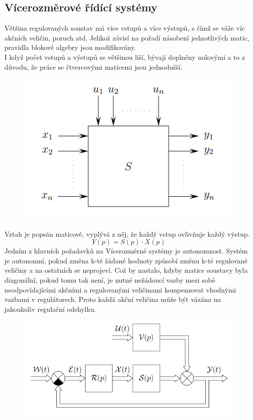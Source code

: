\subsection*{Vícerozměrové řídící systémy}
Většina regulovaných soustav má více vstupů a více výstupů, s čímž se váže víc akčních veličin, poruch atd. Jelikož závisí na pořadí násobení jednotlivých matic, pravidla blokové algebry jsou modifikovány.\\
I když počet vstupů a výstupů se většinou liší, bývají doplněny nulovými a to z důvodu, že práce se čtvercovými maticemi jsou jednodušší.
\begin{figure}[H]
    \includegraphics*[scale = 1]{images/vicerozmerneSoustavy.png}
\end{figure}
Vztah je popsán maticově, vyplývá z něj, že každý vstup ovlivňuje každý výstup.
\begin{equation}
    Y(p) = S(p)\cdot X(p)
\end{equation}
Jedním z hlavních požadavků na Vícerozměrné systémy je autonomnost. Systém je autonomní, pokud změna k-té žádané hodnoty způsobí změnu k-té regulované veličiny a na ostatních se neprojeví. Což by nastalo, kdyby matice soustavy byla diagonální, pokud tomu tak není, je nutné nežádoucí vazby mezi sobě neodpovídajícími akčními a regulovanými veličinami kompenzovat vhodnými vazbami v regulátorech. Proto každá akční veličina může být vázána na jakoukoliv regulační odchylku.\\
\begin{figure}[H]
    \includegraphics*[scale = 1]{images/vicerozmerneSoustavySchema.png}
\end{figure}

